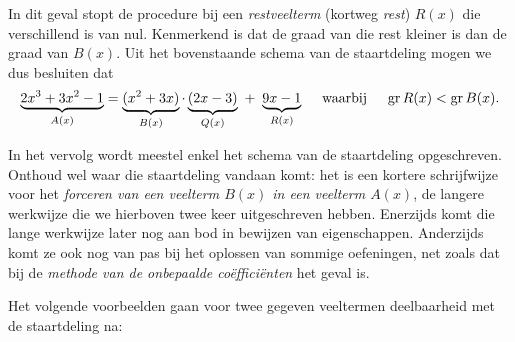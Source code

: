 \documentclass{ximera}
\begin{document}
\begin{algorithm}

	In dit geval stopt de procedure bij een \textit{ restveelterm} (kortweg \textit{ rest}) \(R(x)\) die verschillend is van nul. Kenmerkend is dat de graad van die rest kleiner is dan de graad van \(B(x)\). Uit het bovenstaande schema van de staartdeling mogen we dus besluiten dat
	\[
	\underbrace{2x^3+3x^2-1}_{A(x)} = \underbrace{(x^2+3x)}_{B(x)}\cdot\underbrace{(2x - 3)}_{Q(x)} \,\, + \,\, \underbrace{9x - 1}_{R(x)} \quad \text{ waarbij } \quad \operatorname{gr} R(x) < \operatorname{gr} B(x).
	\]

	\end{algorithm} 
	
	In het vervolg wordt meestel enkel het schema van de staartdeling opgeschreven. Onthoud wel waar die staartdeling vandaan komt: het is een kortere schrijfwijze voor het \textit{ forceren van een veelterm \(B(x)\) in een veelterm \(A(x)\)}, de langere werkwijze die we hierboven twee keer uitgeschreven hebben. Enerzijds komt die lange werkwijze later nog aan bod in bewijzen van eigenschappen. Anderzijds komt ze ook nog van pas bij het oplossen van sommige oefeningen, net zoals dat bij de \textit{methode van de onbepaalde coëfficiënten} het geval is.
	
	


	Het volgende voorbeelden gaan voor twee gegeven veeltermen deelbaarheid met de staartdeling na: 
\end{document}
